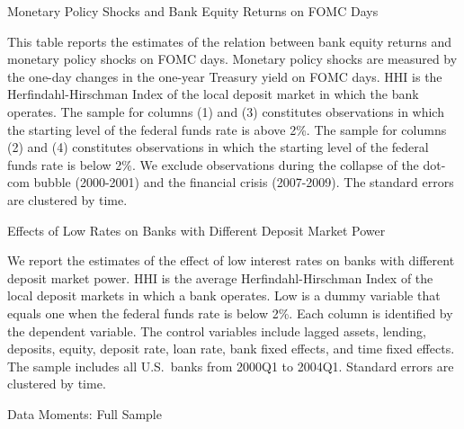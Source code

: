\documentclass[12pt]{article}
\begin{document}
\clearpage
\begin{table}[h]
	\caption{Monetary Policy Shocks and Bank Equity Returns on FOMC Days \label{tab:stock_return_on_FOMC_days_Appendix}}
	\vspace{5mm}
	
	\vspace{5mm}
	
	\footnotesize{\noindent This table reports the estimates of the relation between bank equity returns and monetary policy shocks  on FOMC days. Monetary policy shocks are measured by the one-day changes in the one-year Treasury yield on FOMC days. HHI is the Herfindahl-Hirschman Index of the local deposit market in which the bank operates.  The sample for columns (1) and (3) constitutes observations in which the starting level of the federal funds rate is above 2\%. The sample for columns (2) and (4) constitutes observations in which the starting level of the federal funds rate is below 2\%.   We exclude observations during the collapse of the dot-com bubble (2000-2001) and the  financial crisis (2007-2009). The standard errors are clustered by time.}
	\label{tab:stock_return_on_FOMC_days_one_year}
\end{table}


\clearpage\newpage
\begin{table} 
	\caption{Effects of Low Rates on Banks with Different Deposit Market Power  \label{tab:reversal_lending}}
	\vspace{5mm}
	\footnotesize{\noindent We report the estimates of the effect of low interest rates on banks with different deposit market power. HHI is the average Herfindahl-Hirschman Index of the local deposit markets in which a bank operates. Low is a dummy variable that equals one when the federal funds rate is below 2\%. Each column is identified by the dependent variable. The control variables include lagged assets, lending, deposits, equity, deposit rate, loan rate, bank fixed effects, and time fixed effects. The sample includes all U.S.\ banks from 2000Q1 to 2004Q1. Standard errors are clustered by time. \\}
	
\end{table}


\clearpage\newpage
\begin{table}[h]
	\caption{Data Moments: Full Sample}
	\vspace{5mm}
	
	\vspace{5mm}
\end{table}
\end{document}
